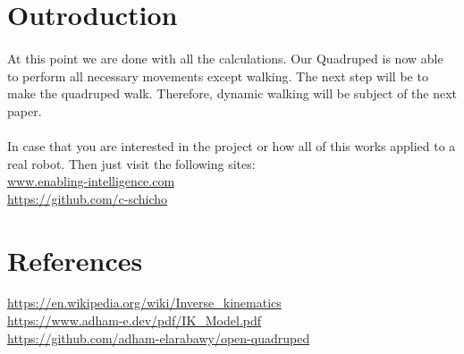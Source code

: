 \documentclass{article}
\begin{document}





    \section{Outroduction}
    \paragraph{}
    At this point we are done with all the calculations. Our Quadruped is now able to perform all necessary movements except walking. The next step will be to make the quadruped walk. Therefore, dynamic walking will be subject of the next paper.
    \paragraph{}
    In case that you are interested in the project or how all of this works applied to a real robot. Then just visit the following sites: \\
    \url{www.enabling-intelligence.com} \\
    \url{https://github.com/c-schicho}



    \section{References}
    \url{https://en.wikipedia.org/wiki/Inverse_kinematics} \\
    \url{https://www.adham-e.dev/pdf/IK_Model.pdf} \\
    \url{https://github.com/adham-elarabawy/open-quadruped}
\end{document}
